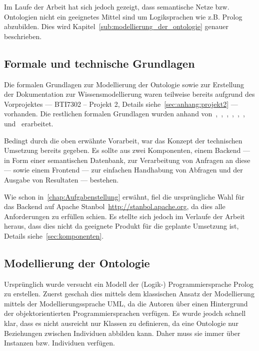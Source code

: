 Im Laufe der Arbeit hat sich jedoch gezeigt, dass semantische Netze bzw. Ontologien nicht ein geeignetes Mittel sind um Logiksprachen wie z.B. Prolog abzubilden. Dies wird Kapitel~\autoref{sub:modellierung_der_ontologie} genauer beschrieben.

\subsection{Formale und technische Grundlagen}
\label{sub:formale_und_technische_grundlagen}
Die formalen Grundlagen zur Modellierung der Ontologie sowie zur Erstellung der Dokumentation zur Wissensmodellierung waren teilweise bereits aufgrund des Vorprojektes --- BTI7302 -- Projekt 2, Details siehe~\autoref{sec:anhang:projekt2} --- vorhanden. Die restlichen formalen Grundlagen wurden anhand von~\cite{IspekOntoBedeutung},~\cite{ISpekOntoGeschichte},~\cite{w3sparql_querylang},~\cite{w3sparql_overview},~\cite{w3rdf_syntax},~\cite{w3rdf},~\cite{w3owl} und~\cite{swrl} erarbeitet.

Bedingt durch die oben erwähnte Vorarbeit, war das Konzept der technischen Umsetzung bereits gegeben. Es sollte aus zwei Komponenten, einem Backend --- in Form einer semantischen Datenbank, zur Verarbeitung von Anfragen an diese --- sowie einem Frontend --- zur einfachen Handhabung von Abfragen und der Ausgabe von Resultaten --- bestehen.

Wie schon in~\autoref{chap:Aufgabenstellung} erwähnt, fiel die ursprüngliche Wahl für das Backend auf Apache Stanbol~\url{http://stanbol.apache.org}, da dies alle Anforderungen zu erfüllen schien. Es stellte sich jedoch im Verlaufe der Arbeit heraus, dass dies nicht da geeignete Produkt für die geplante Umsetzung ist, Details siehe~\autoref{sec:komponenten}.

\subsection{Modellierung der Ontologie}
\label{sub:modellierung_der_ontologie}
Ursprünglich wurde versucht ein Modell der (Logik-) Programmiersprache Prolog zu erstellen. Zuerst geschah dies mittels dem klassischen Ansatz der Modellierung mittels der Modellierungssprache UML, da die Autoren über einen Hintergrund der objektorientierten Programmiersprachen verfügen. Es wurde jeodch schnell klar, dass es nicht ausreicht nur Klassen zu definieren, da eine Ontologie nur Beziehungen zwischen Individuen abbilden kann. Daher muss sie immer über Instanzen bzw. Individuen verfügen.

